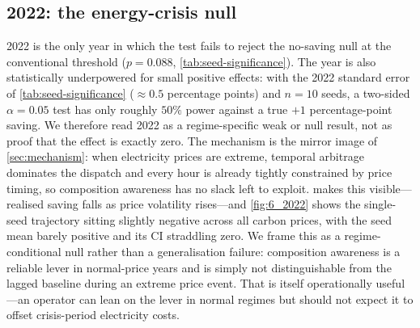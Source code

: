 \documentclass[11pt]{article}
\begin{document}
\subsection{2022: the energy-crisis null}
\label{sec:2022}


2022 is the only year in which the test fails to reject the no-saving null at
the conventional threshold ($p=0.088$, \cref{tab:seed-significance}). The
year is also statistically underpowered for small positive effects: with the
2022 standard error of \cref{tab:seed-significance} ($\approx 0.5$ percentage
points) and $n=10$ seeds, a two-sided $\alpha=0.05$ test has only roughly
$50\%$ power against a true $+1$ percentage-point saving. We therefore read 2022 as a regime-specific weak
or null result, not as proof that the effect is exactly zero. The
mechanism is the mirror image of \cref{sec:mechanism}: when electricity
prices are extreme, temporal arbitrage dominates the dispatch and every hour
is already tightly constrained by price timing, so composition awareness has
no slack left to exploit.  makes this visible---realised
saving falls as price volatility rises---and \cref{fig:6_2022} shows the
single-seed trajectory sitting slightly negative across all carbon prices,
with the seed mean barely positive and its CI straddling zero. We frame this
as a regime-conditional null rather than a generalisation failure:
composition awareness is a reliable lever in normal-price years and is simply
not distinguishable from the lagged baseline during an extreme price event.
That is itself operationally useful---an operator can lean on the lever in
normal regimes but should not expect it to offset crisis-period electricity
costs.
\end{document}
